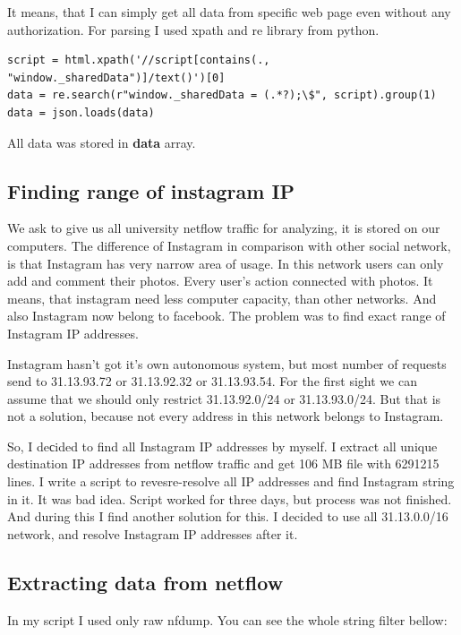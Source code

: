 It means, that I can simply get all data from specific web page even without any authorization. For parsing I used xpath and re library from python. 

\begin{lstlisting}
script = html.xpath('//script[contains(., "window._sharedData")]/text()')[0]
data = re.search(r"window._sharedData = (.*?);\$", script).group(1)
data = json.loads(data)
\end{lstlisting}

All data was stored in \textbf{data} array.

\subsection{Finding range of instagram IP}

We ask to give us all university netflow traffic for analyzing, it is stored on our computers. The difference of Instagram in comparison with other social network, is that Instagram has very narrow area of usage. In this network users can only add and comment their photos. Every user’s action connected with photos. It means, that instagram need less computer capacity, than other networks. And also Instagram now belong to facebook. The problem was to find exact range of Instagram IP addresses. 

Instagram hasn’t got it’s own autonomous system, but most number of requests send to 31.13.93.72 or 31.13.92.32 or 31.13.93.54. For the first sight we can assume that we should only restrict 31.13.92.0/24 or 31.13.93.0/24. But that is not a solution, because not every address in this network belongs to Instagram.

So, I deсided to find all Instagram IP addresses by myself. I extract all unique destination IP addresses from netflow traffic and get 106 MB file with 6291215 lines. I write a script to revesre-resolve all IP addresses and find Instagram string in it. It was bad idea. Script worked for three days, but process was not finished. And during this I find another solution for this. I decided to use all 31.13.0.0/16 network, and resolve Instagram IP addresses after it.

\subsection{Extracting data from netflow}

In my script I used only raw nfdump. You can see the whole string filter bellow:

